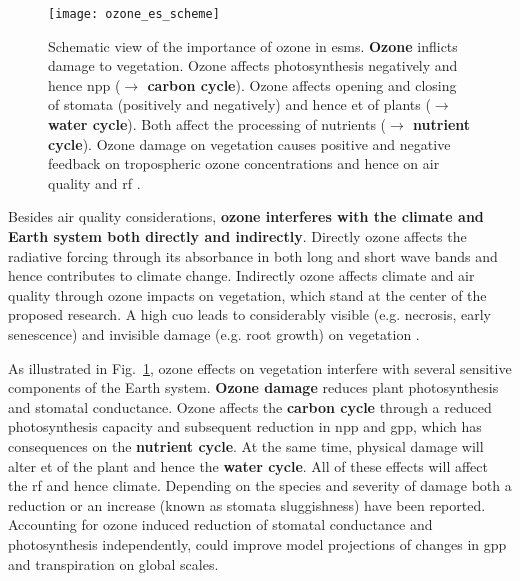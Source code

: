 \begin{figure}[b]
  \centering
  \texttt{[image: ozone\_es\_scheme]}
  \caption{Schematic view of the importance of ozone in \glspl{esm}. \textbf{\color{red}Ozone} inflicts damage to vegetation. Ozone affects photosynthesis negatively and hence \gls{npp} (\textbf{\color{darkgray}$\rightarrow$ carbon cycle}). Ozone affects opening and closing of stomata (positively and negatively) and hence \gls{et} of plants (\textbf{\color{blue}$\rightarrow$ water cycle}). Both affect the processing of nutrients (\textbf{\color{darkgray}$\rightarrow$ nutrient cycle}). Ozone damage on vegetation causes positive and negative feedback on tropospheric ozone concentrations and hence on air quality and \gls{rf} \parencite{Nat:Sitch2007}.}
  \label{fig:ozone_esm_scheme}
\end{figure}

Besides air quality considerations, \textbf{ozone interferes with the climate and Earth system both directly and indirectly}. Directly ozone affects the radiative forcing through its absorbance in both long and short wave bands and hence contributes to climate change. Indirectly ozone affects climate and air quality through ozone impacts on vegetation, which stand at the center of the proposed research. A high \gls{cuo} leads to considerably visible (e.g. necrosis, early senescence) and invisible damage (e.g. root growth) on vegetation \parencite{GCB:Mills2011}.

As illustrated in Fig.~\ref{fig:ozone_esm_scheme}, ozone effects on vegetation interfere with several sensitive components of the Earth system. \textbf{\color{red}Ozone damage} reduces plant photosynthesis and stomatal conductance. Ozone affects the \textbf{\color{darkgray}carbon cycle} through a reduced photosynthesis capacity and subsequent reduction in \gls{npp} and \gls{gpp}, which has consequences on the \textbf{\color{darkgray}nutrient cycle}. At the same time, physical damage will alter \gls{et} of the plant and hence the \textbf{\color{blue}water cycle}. All of these effects will affect the \gls{rf} and hence climate. Depending on the species and severity of damage both a reduction \parencite{Oe:Lombardozzi2012} or an increase (known as stomata sluggishness) \parencite{SR:Hoshika2015} have been reported. Accounting for ozone induced reduction of stomatal conductance and photosynthesis independently, \textcite{BGS:Lombardozzi2012} could improve model projections of changes in \gls{gpp} and transpiration on global scales.

